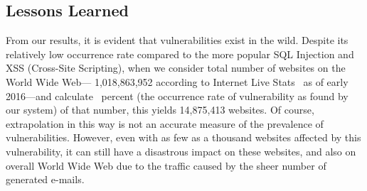 \subsection{Lessons Learned}
From our results, it is evident that \ehi vulnerabilities exist in the wild.
Despite its relatively low occurrence rate compared to the more popular SQL Injection and XSS (Cross-Site Scripting), when we consider total number of websites on the World Wide Web--- 1,018,863,952 according to Internet Live Stats~\cite{InternetLiveStats2016} as of early 2016---and calculate \successDelta\ percent (the occurrence rate of \ehi vulnerability as found by our system) of that number, this yields 14,875,413 websites. Of course, extrapolation in this way is not an accurate measure of the prevalence of \ehi vulnerabilities. However, even with as few as a thousand websites affected by this vulnerability, it can still have a disastrous impact on these websites, and also on overall World Wide Web due to the traffic caused by the sheer number of generated e-mails. 
    
    
    
